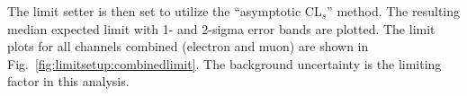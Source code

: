 The limit setter is then set to utilize
the ``asymptotic CL$_{s}$''
\cite{cite:asympcls1,cite:asympcls2} method. 
The resulting median
expected limit with 1- and 2-sigma error bands are plotted.
The limit plots for all channels combined
(electron and muon)
are shown in
Fig.~\ref{fig:limitsetup:combinedlimit}. 
The background uncertainty is the limiting factor in this analysis.
\begin{figure}[htb] 
  \begin{center}
    \\
\end{center}
\end{figure}
